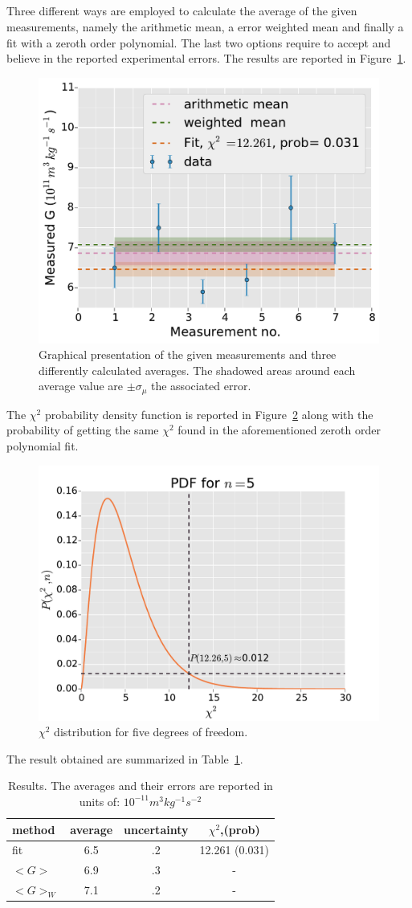 \documentclass[twocolumn]{article}
\begin{document}
\subsection{} %
	Three different ways are employed to calculate the average of the given measurements, namely the arithmetic mean, a error weighted mean and finally a fit with a zeroth order polynomial.
	The last two options require to accept and believe in the reported experimental errors.
	The results are reported in Figure~\ref{fig:g}.
	\begin{figure}[h!]
		\begin{center}
			\includegraphics[width=.4\textwidth]{fig/g.pdf}
		\end{center}
		\caption{Graphical presentation of the given measurements and three differently calculated averages. The shadowed areas around each average value are $\pm \sigma_{\mu}$ the associated error.}
		\label{fig:g}
	\end{figure}
	The $\chi ^2 $ probability density function is reported in Figure~\ref{fig:xpdf} along with the probability of getting the same $\chi ^2 $ found in the aforementioned zeroth order polynomial fit.
	\begin{figure}[!]
		\begin{center}
			\includegraphics[width=.4 \textwidth]{fig/xpdf.pdf}
		\end{center}
		\caption{$\chi^2$ distribution for five degrees of freedom.}
		\label{fig:xpdf}
	\end{figure}
	The result obtained are summarized in Table~\ref{tab:res}.
	\begin{table}[h]
		\caption{Results. The averages and their errors are reported in units of:
		$10^{-11} m^3 kg^{-1} s^{-2}$}
		\label{tab:res}
		\begin{center}
			\begin{tabular}{l|ccc}
			\hline

			\hline
			\textbf{method} & \textbf{average} & \textbf{uncertainty} & \textbf{$\chi ^2 $,(prob)} \\
			\hline
			fit & 6.5 & .2 & 12.261 (0.031) \\
			$<G> $ & 6.9 & .3 & - \\
			$<G>_W$ &  7.1 & .2 & - \\
			\hline
			\hline
			\end{tabular}
		\end{center}
	\end{table}
\end{document}
